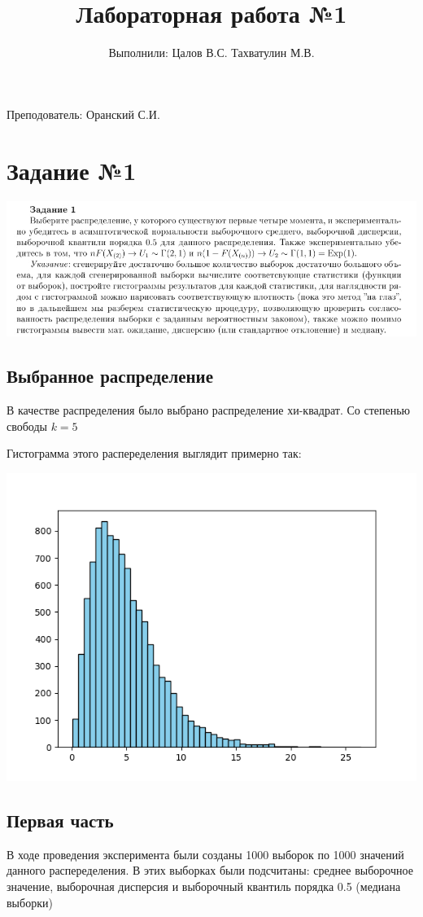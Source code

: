 \documentclass{article}
\title{Лабораторная работа №1}
\author{Выполнили: Цалов В.С. Тахватулин М.В.}
\begin{document}
\maketitle
\begin{center}
      {\fontsize{14}{15}\selectfont
            Преподователь: Оранский С.И.
      }
\end{center}


\section{Задание №1}\label{sec:-no1}


\begin{center}
      \centering
      \includegraphics[width=1\linewidth]{1}
\end{center}

\subsection{Выбранное распределение}\label{subsec:-}

В качестве распределения было выбрано распределение хи-квадрат. Со степенью свободы $k = 5$

Гистограмма этого распеределения выглядит примерно так:

\begin{center}
      \centering
      \includegraphics[width=0.5\linewidth]{Python/chi}
\end{center}

\subsection{Первая часть}\label{subsec:-2}
В ходе проведения эксперимента были созданы 1000 выборок по 1000 значений данного распеределения.
В этих выборках были подсчитаны: среднее выборочное значение, выборочная дисперсия и выборочный квантиль порядка 0.5 (медиана выборки)
\end{document}
